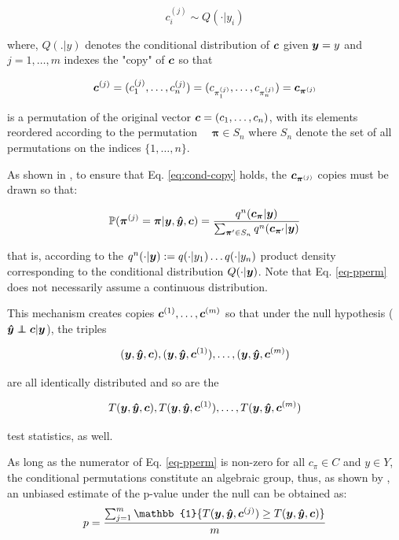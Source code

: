 \documentclass{article}
\begin{document}
\begin{equation}
    c_i^{(j)} \sim Q(\cdot|y_i)
     \label{eq:cond-copy}
\end{equation}

where, $Q(.|y)$ denotes the conditional distribution of $\boldsymbol{c}$ given $\boldsymbol{y}=y$ and $j=1,\dots, m$ indexes the "copy" of $\boldsymbol{c}$ so that

$$ \boldsymbol{c}^{(j)} = (c_1^{(j)}, \dots, c_n^{(j)}) = (c_{\pi_1^{(j)}}, \dots, c_{\pi_n^{(j)}}) =  \boldsymbol{c}_{\boldsymbol{\pi}^{(j)}} $$

is a permutation of the original vector $\boldsymbol{c} = (c_1, \dots, c_n)$, with its elements reordered according to the permutation $\quad \boldsymbol{\pi} \in S_n$ where $S_n$ denote the set of all permutations on the indices $\{1,\dots,n\}$.

As shown in \citep{berrett2020conditional}, to ensure that Eq. \ref{eq:cond-copy} holds, the $\boldsymbol{c}_{\boldsymbol{\pi}^{(j)}}$ copies must be drawn so that:

\begin{equation}
    \label{eq-pperm}
    \mathbb{P}(\boldsymbol{ \pi }^{(j)} = \boldsymbol{ \pi } | \boldsymbol{y},\boldsymbol{\hat{y}},\boldsymbol{c}) = \frac{q^n(\boldsymbol{c}_{\boldsymbol{ \pi }} | \boldsymbol{y})}{\sum_{\boldsymbol{ \pi } ' \in S_n} q^n(\boldsymbol{c}_{\boldsymbol{ \pi } ' } | \boldsymbol{y})}
\end{equation}


that is, according to the $q^n(\cdot|\boldsymbol{y}) := q(\cdot | y_1) \dots q(\cdot|y_n)$ product density corresponding to the conditional distribution $Q(\cdot|\boldsymbol{y})$. Note that Eq. \ref{eq-pperm} does not necessarily assume a continuous distribution.

This mechanism creates copies $\boldsymbol{c}^{(1)}, \dots ,\boldsymbol{c}^{(m)}$ so that under the null hypothesis ($\yhat \independent \c | \y$), the triples 

$$(\boldsymbol{y},\boldsymbol{\hat{y}},\boldsymbol{c}), (\boldsymbol{y}, \boldsymbol{\hat{y}}, \boldsymbol{c}^{(1)}),\dots, (\boldsymbol{y}, \boldsymbol{\hat{y}}, \boldsymbol{c}^{(m)})$$

are all identically distributed and so are the 

$$T(\boldsymbol{y},\boldsymbol{\hat{y}},\boldsymbol{c}), T(\boldsymbol{y}, \boldsymbol{\hat{y}}, \boldsymbol{c}^{(1)}),\dots,T(\boldsymbol{y}, \boldsymbol{\hat{y}}, \boldsymbol{c}^{(m)})$$

test statistics, as well.

As long as the numerator of Eq. \ref{eq-pperm} is non-zero for all $c_\pi \in C$ and $y \in Y$, the conditional permutations constitute an algebraic group, thus, as shown by \citep{hemerik2018exact}, an unbiased estimate of the p-value under the null can be obtained as:
$$ p= \frac{\sum_{j=1}^m \mathbb{1} \{T(\y, \yhat, \c^{(j)}) \geq T(\y, \yhat, \c) \}  }{m}$$
\end{document}
